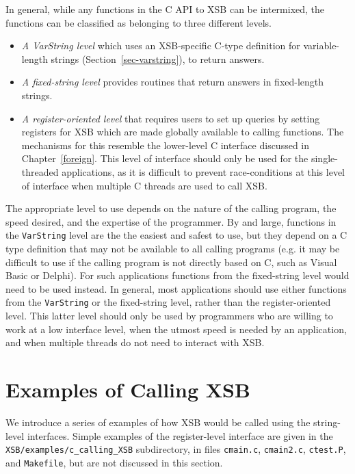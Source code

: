 In general, while any functions in the C API to XSB can be intermixed,
the functions can be classified as belonging to three different
levels.
%
\begin{itemize}
\item {\em A VarString level} which uses an XSB-specific C-type
  definition for variable-length strings
  (Section~\ref{sec-varstring}), to return answers.
%
\item {\em A fixed-string level} provides routines that return answers
  in fixed-length strings.
%
\item {\em A register-oriented level} that requires users to set up
  queries by setting registers for XSB which are made globally
  available to calling functions.  The mechanisms for this resemble
  the lower-level C interface discussed in Chapter~\ref{foreign}.
  This level of interface should only be used for the single-threaded
  applications, as it is difficult to prevent race-conditions at this
  level of interface when multiple C threads are used to call XSB.

\end{itemize}
%
The appropriate level to use depends on the nature of the calling
program, the speed desired, and the expertise of the programmer.  By
and large, functions in the {\tt VarString} level are the the easiest
and safest to use, but they depend on a C type definition that may not
be available to all calling programs (e.g. it may be difficult to use
if the calling program is not directly based on C, such as Visual
Basic or Delphi).  For such applications functions from the
fixed-string level would need to be used instead.  In general, most
applications should use either functions from the {\tt VarString} or
the fixed-string level, rather than the register-oriented level.  This
latter level should only be used by programmers who are willing to
work at a low interface level, when the utmost speed is needed by an
application, and when multiple threads do not need to interact with
XSB.




\section{Examples of Calling XSB}

We introduce a series of examples of how XSB would be called using the
string-level interfaces.  Simple examples of the register-level
interface are given in the {\tt XSB/examples/c\_calling\_XSB}
subdirectory, in files {\tt cmain.c}, {\tt cmain2.c}, {\tt ctest.P},
and {\tt Makefile}, but are not discussed in this section.

